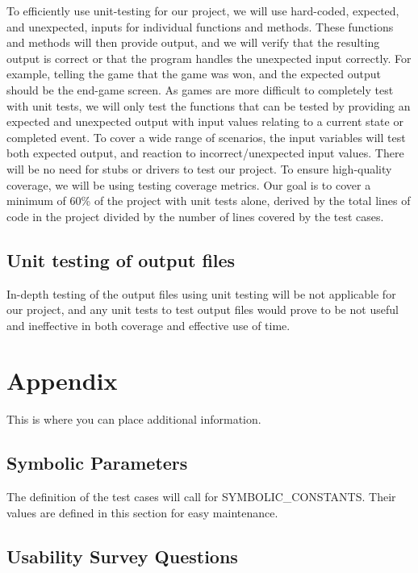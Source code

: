 \documentclass[12pt, titlepage]{article}
\begin{document}
To efficiently use unit-testing for our project, we will use hard-coded, expected, and unexpected, inputs for individual functions and methods. These functions and methods will then provide output, and we will verify that the resulting output is correct or that the program handles the unexpected input correctly. For example, telling the game that the game was won, and the expected output should be the end-game screen. As games are more difficult to completely test with unit tests, we will only test the functions that can be tested by providing an expected and unexpected output with input values relating to a current state or completed event. To cover a wide range of scenarios, the input variables will test both expected output, and reaction to incorrect/unexpected input values. There will be no need for stubs or drivers to test our project. To ensure high-quality coverage, we will be using testing coverage metrics. Our goal is to cover a minimum of 60\% of the project with unit tests alone, derived by the total lines of code in the project divided by the number of lines covered by the test cases.
	
\subsection{Unit testing of output files}	

In-depth testing of the output files using unit testing will be not applicable for our project, and any unit tests to test output files would prove to be not useful and ineffective in both coverage and effective use of time.





\newpage

\section{Appendix}

This is where you can place additional information.

\subsection{Symbolic Parameters}

The definition of the test cases will call for SYMBOLIC\_CONSTANTS.
Their values are defined in this section for easy maintenance.

\subsection{Usability Survey Questions}
\end{document}
